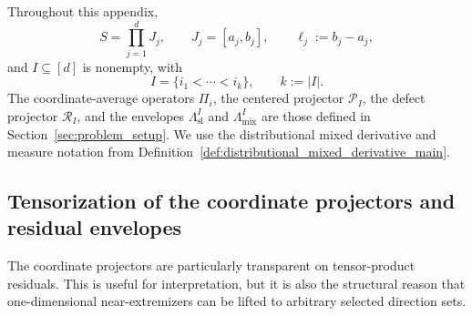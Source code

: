 \documentclass[11pt,letterpaper]{article}
\theoremstyle{definition}
\theoremstyle{remark}
\begin{document}
Throughout this appendix,
$$
S=\prod_{j=1}^d J_j,
\qquad
J_j=[a_j,b_j],
\qquad
\ell_j:=b_j-a_j,
$$
and $I\subseteq[d]$ is nonempty, with
$$
I=\{i_1<\cdots<i_k\},
\qquad
k:=|I|.
$$
The coordinate-average operators $\Pi_i$, the centered projector
$\mathcal P_I$, the defect projector $\mathcal R_I$, and the envelopes
$\Lambda_{\mathrm{sl}}^I$ and $\Lambda_{\mathrm{mix}}^I$ are those defined in
Section~\ref{sec:problem_setup}. We use the distributional mixed derivative
and measure notation from Definition~\ref{def:distributional_mixed_derivative_main}.

  
\subsection{Tensorization of the coordinate projectors and residual envelopes}
\label{subsec:appendix_tensorization_projectors}
  

The coordinate projectors are particularly transparent on tensor-product
residuals. This is useful for interpretation, but it is also the structural
reason that one-dimensional near-extremizers can be lifted to arbitrary
selected direction sets.
\end{document}
